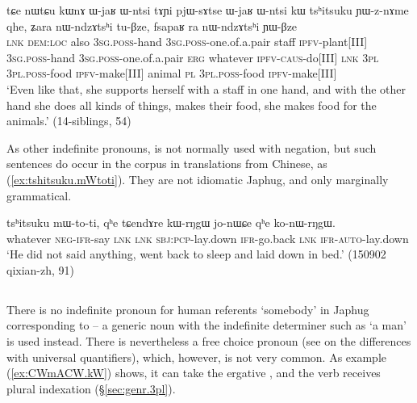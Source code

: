 \begin{exe}
\ex \label{ex:tshitsuku.YWznAme}
\gll  
tɕe nɯtɕu kɯnɤ ɯ-jaʁ ɯ-ntsi tɤɲi pjɯ-sɤtse  ɯ-jaʁ ɯ-ntsi kɯ tsʰitsuku ɲɯ-z-nɤme qhe, ʑara nɯ-ndzɤtsʰi tu-βze, fsapaʁ ra nɯ-ndzɤtsʰi ɲɯ-βze \\
\textsc{lnk} \textsc{dem}:\textsc{loc} also \textsc{3sg}.\textsc{poss}-hand \textsc{3sg}.\textsc{poss}-one.of.a.pair staff \textsc{ipfv}-plant[III]  \textsc{3sg}.\textsc{poss}-hand \textsc{3sg}.\textsc{poss}-one.of.a.pair \textsc{erg} whatever \textsc{ipfv}-\textsc{caus}-do[III] \textsc{lnk} \textsc{3pl} \textsc{3pl}.\textsc{poss}-food \textsc{ipfv}-make[III] animal \textsc{pl} \textsc{3pl}.\textsc{poss}-food \textsc{ipfv}-make[III]  \\
\glt `Even like that, she supports herself with a staff in one hand, and with the other hand she does all kinds of things, makes their food, she makes food for the animals.' (14-siblings, 54)
\end{exe}

As other indefinite pronouns,  is not normally used with negation, but such sentences do occur in the corpus in translations from Chinese, as (\ref{ex:tshitsuku.mWtoti}). They are not idiomatic Japhug, and only marginally grammatical.

\begin{exe}
\ex \label{ex:tshitsuku.mWtoti}
\gll   tsʰitsuku mɯ-to-ti, qʰe tɕendɤre kɯ-rŋgɯ jo-nɯɕe qʰe ko-nɯ-rŋgɯ. \\
whatever \textsc{neg}-\textsc{ifr}-say \textsc{lnk} \textsc{lnk} \textsc{sbj}:\textsc{pcp}-lay.down \textsc{ifr}-go.back \textsc{lnk} \textsc{ifr}-\textsc{auto}-lay.down \\
\glt `He did not said anything, went back to sleep and laid down in bed.' (150902 qixian-zh, 91)
\end{exe}

 \subsection{} \label{sex:CWmACW}
 There is no indefinite pronoun for human referents `somebody' in Japhug  corresponding to  -- a generic noun with the indefinite determiner  such as  `a man' is used instead. There is nevertheless a free choice pronoun  (see \citealt[48--52]{haspelmath97indef} on the differences with universal quantifiers), which, however, is not very common. As example (\ref{ex:CWmACW.kW}) shows, it can take the ergative , and the verb receives plural indexation (§\ref{sec:genr.3pl}). 
 
